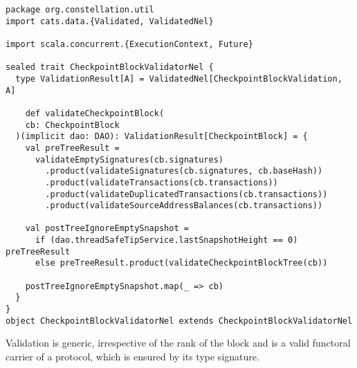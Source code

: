 \documentclass{article}
\begin{document}
\begin{lstlisting}[caption={Validation pipeline in Constellation},style=myScalastyle]
package org.constellation.util
import cats.data.{Validated, ValidatedNel}

import scala.concurrent.{ExecutionContext, Future}

sealed trait CheckpointBlockValidatorNel {
  type ValidationResult[A] = ValidatedNel[CheckpointBlockValidation, A]
  
    def validateCheckpointBlock(
    cb: CheckpointBlock
  )(implicit dao: DAO): ValidationResult[CheckpointBlock] = {
    val preTreeResult =
      validateEmptySignatures(cb.signatures)
        .product(validateSignatures(cb.signatures, cb.baseHash))
        .product(validateTransactions(cb.transactions))
        .product(validateDuplicatedTransactions(cb.transactions))
        .product(validateSourceAddressBalances(cb.transactions))

    val postTreeIgnoreEmptySnapshot =
      if (dao.threadSafeTipService.lastSnapshotHeight == 0) preTreeResult
      else preTreeResult.product(validateCheckpointBlockTree(cb))

    postTreeIgnoreEmptySnapshot.map(_ => cb)
  }
}
object CheckpointBlockValidatorNel extends CheckpointBlockValidatorNel
\end{lstlisting}
Validation is generic, irrespective of the rank of the block and is a valid functoral carrier of a protocol, which is ensured by its type signature.
\end{document}
